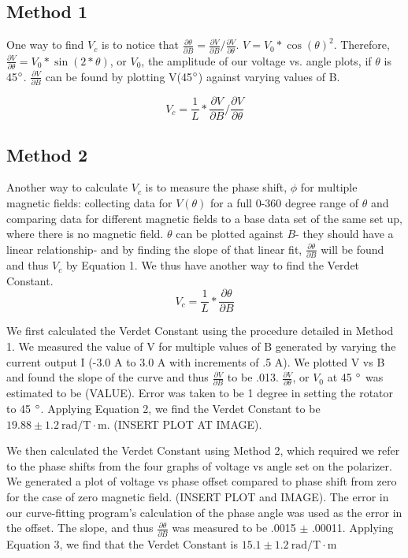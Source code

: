 \documentclass[prb,preprint]{revtex4-1}
\begin{document}
{\subsection{Method 1}

{One way to find $V_{c}$ is to notice that $\frac{\partial \theta}{\partial B}=\frac{\partial V}{\partial B}/ \frac{\partial V}{\partial \theta}$.     $V=V_{0}*\cos(\theta)^{2}$.  Therefore,  $ \frac{\partial V}{\partial \theta} = V_{0}*\sin(2*\theta)$, or $V_{0}$, the amplitude of our voltage vs. angle plots, if $\theta$ is 45$\degree$.  $\frac{\partial V}{\partial B}$ can be found by plotting V(45$\degree$) against varying values of B. }

\begin{equation}
V_{c} =\frac{1}{L} * \frac{\partial V}{\partial B} /  \frac{\partial V}{\partial \theta} 
\end{equation}

\subsection{Method 2}

Another way to calculate $V_{c}$ is to measure the phase shift, $\phi$ for multiple magnetic fields:  collecting data for $V(\theta)$ for a full 0-360 degree range of $\theta$ and comparing data for different magnetic fields to a base data set of the same set up, where there is no magnetic field.  $\theta$ can be plotted against $B$- they should have a linear relationship- and by finding the slope of that linear fit, $\frac{\partial \theta}{\partial B}$ will be found and thus $V_{c}$ by Equation 1. We thus have another way to find the Verdet Constant.
\begin{equation}
V_{c} =\frac{1}{L} * \frac{\partial \theta}{\partial B} 
\end{equation}

We first calculated the Verdet Constant using the procedure detailed in Method 1.  We measured the value of V for multiple values of B generated by varying the current output I (-3.0 A to 3.0 A with increments of .5 A).  We plotted V vs B and found the slope of the curve and thus $\frac{\partial V}{\partial B}$ to be .013.  $\frac{\partial V}{\partial \theta}$, or $V_{0}$ at 45 $\degree$ was estimated to be (VALUE).  Error was taken to be 1 degree in setting the rotator to 45 $\degree$.  Applying Equation 2, we find the Verdet Constant to be $19.88 \pm 1.2 \mathrm{~rad/T} \cdot \textrm{m}$. (INSERT PLOT AT IMAGE).
{We then calculated the Verdet Constant using Method 2, which required we refer to the phase shifts from the four graphs of voltage vs angle set on the polarizer.  We generated a plot of voltage vs phase offset compared to phase shift from zero for the case of zero magnetic field.  (INSERT PLOT and IMAGE).  The error in our curve-fitting program's calculation of the phase angle was used as the error in the offset.  The slope, and thus $\frac{\partial \theta}{\partial B}$ was measured to be .0015 $\pm$ .00011.  Applying Equation 3, we find that the Verdet Constant is $15.1 \pm 1.2 \mathrm{~rad/T} \cdot \textrm{m}$

}}
\end{document}
